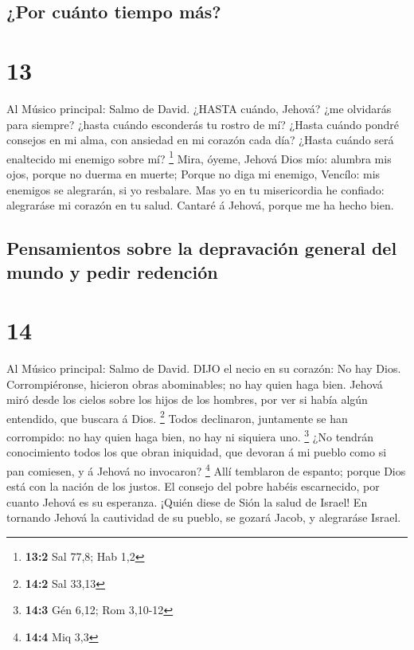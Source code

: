 \hypertarget{por-cuuxe1nto-tiempo-muxe1s}{%
\subsection{¿Por cuánto tiempo más?}\label{por-cuuxe1nto-tiempo-muxe1s}}

\hypertarget{section-12}{%
\section{13}\label{section-12}}

 Al Músico principal: Salmo de David. ¿HASTA cuándo, Jehová?
¿me olvidarás para siempre? ¿hasta cuándo esconderás tu rostro de mí?
 ¿Hasta cuándo pondré consejos en mi alma, con ansiedad en
mi corazón cada día? ¿Hasta cuándo será enaltecido mi enemigo sobre mí?
\footnote{\textbf{13:2} Sal 77,8; Hab 1,2}  Mira, óyeme,
Jehová Dios mío: alumbra mis ojos, porque no duerma en muerte;
 Porque no diga mi enemigo, Vencílo: mis enemigos se
alegrarán, si yo resbalare.  Mas yo en tu misericordia he
confiado: alegraráse mi corazón en tu salud.  Cantaré á
Jehová, porque me ha hecho bien.

\hypertarget{pensamientos-sobre-la-depravaciuxf3n-general-del-mundo-y-pedir-redenciuxf3n}{%
\subsection{Pensamientos sobre la depravación general del mundo y pedir
redención}\label{pensamientos-sobre-la-depravaciuxf3n-general-del-mundo-y-pedir-redenciuxf3n}}

\hypertarget{section-13}{%
\section{14}\label{section-13}}

 Al Músico principal: Salmo de David. DIJO el necio en su
corazón: No hay Dios. Corrompiéronse, hicieron obras abominables; no hay
quien haga bien.  Jehová miró desde los cielos sobre los
hijos de los hombres, por ver si había algún entendido, que buscara á
Dios. \footnote{\textbf{14:2} Sal 33,13}  Todos declinaron,
juntamente se han corrompido: no hay quien haga bien, no hay ni siquiera
uno. \footnote{\textbf{14:3} Gén 6,12; Rom 3,10-12}  ¿No
tendrán conocimiento todos los que obran iniquidad, que devoran á mi
pueblo como si pan comiesen, y á Jehová no invocaron? \footnote{\textbf{14:4}
  Miq 3,3}  Allí temblaron de espanto; porque Dios está con
la nación de los justos.  El consejo del pobre habéis
escarnecido, por cuanto Jehová es su esperanza.  ¡Quién
diese de Sión la salud de Israel! En tornando Jehová la cautividad de su
pueblo, se gozará Jacob, y alegraráse Israel.

